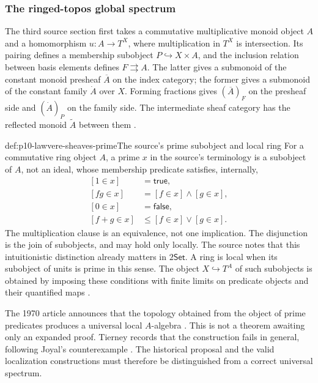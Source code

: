 \subsubsection{The ringed-topos global spectrum}

The third source section first takes a commutative multiplicative
monoid object \(A\) and a homomorphism
\(u:A\to T^X\), where multiplication in \(T^X\) is
intersection.  Its pairing defines a membership subobject
\(P\hookrightarrow X\times A\), and the inclusion relation
between basis elements defines \(F\rightrightarrows A\).
The latter gives a submonoid of the constant monoid presheaf
\(\overline A\) on the index category; the former gives a
submonoid of the constant family \(\dot A\) over \(X\).
Forming fractions gives \((\overline A)_F\) on the presheaf
side and \((\dot A)_P\) on the family side.  The intermediate
sheaf category has the reflected monoid \(\widetilde A\)
between them \cite[p.~333]{Lawvere1970}.

\begin{hbdefinition}{def:p10-lawvere-sheaves-prime}{The source's prime subobject and local ring}
For a commutative ring object \(A\), a prime \(x\) in the
source's terminology is a subobject of \(A\), not an ideal,
whose membership predicate satisfies, internally,
\[
\begin{aligned}
 [1\in x]&=\mathsf{true},\\
 [fg\in x]&=[f\in x]\land[g\in x],\\
 [0\in x]&=\mathsf{false},\\
 [f+g\in x]&\leq[f\in x]\lor[g\in x].
\end{aligned}
\]
The multiplication clause is an equivalence, not one implication.
The disjunction is the join of subobjects, and may hold only
locally.  The source notes that this intuitionistic distinction
already matters in \(2\mathsf{Set}\).  A ring is local when
its subobject of units is prime in
this sense.  The object \(X\hookrightarrow T^A\) of such
subobjects is obtained by imposing these conditions with finite
limits on predicate objects and their quantified maps
\cite[pp.~333--334]{Lawvere1970}.
\end{hbdefinition}

The 1970 article announces that the topology obtained from the object
of prime predicates produces a universal local \(A\)-algebra
\cite[p.~334]{Lawvere1970}. This is not a theorem awaiting only an
expanded proof. Tierney records that the construction fails in
general, following Joyal's counterexample
\cite[pp.~189, 200--201]{Tierney1976Spectrum}.
The historical proposal and the valid localization constructions must
therefore be distinguished from a correct universal spectrum.

